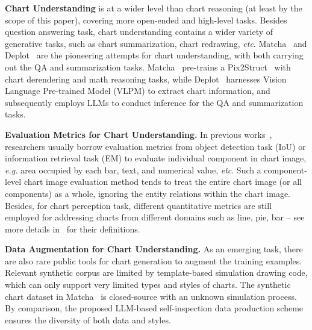 \documentclass{article} \usepackage{iclr2024_conference,times}
\begin{document}
\textbf{Chart Understanding} is at a wider level than chart reasoning (at least by the scope of this paper), covering more open-ended and high-level tasks. Besides question answering task, chart understanding contains a wider variety of generative tasks, such as chart summarization, chart redrawing, \textit{etc}. Matcha~\citep{Liu2022MatChaEV} and Deplot~\citep{Liu2022DePlotOV} are the pioneering attempts for chart understanding, with both carrying out the QA and summarization tasks. Matcha~\citep{Liu2022MatChaEV} pre-trains a Pix2Struct~\citep{Lee2022Pix2StructSP} with chart derendering and math reasoning tasks, while Deplot~\citep{Liu2022DePlotOV} harnesses Vision Language Pre-trained Model (VLPM) to extract chart information, and subsequently employs LLMs to conduct inference for the QA and summarization tasks.



\textbf{Evaluation Metrics for Chart Understanding.} In previous works~\citep{Savva2011ReVisionAC,Rane2021ChartReaderAP,Liu2019DataEF,Choi2019VisualizingFT}, researchers usually borrow evaluation metrics from object detection task (IoU) or information retrieval task (EM) to evaluate individual component in chart image, \textit{e.g.} area occupied by each bar, text, and numerical value, \textit{etc}. Such a component-level chart image evaluation method tends to treat the entire chart image (or all components) as a whole, ignoring the entity relations within the chart image.
Besides, for chart perception task, different quantitative metrics are still employed for addressing charts from different domains such as line, pie, bar -- see more details in~\citep{Luo2021ChartOCRDE} for their definitions. 

\textbf{Data Augmentation for Chart Understanding.} 
As an emerging task, there are also rare public tools for chart generation to augment the training examples. Relevant synthetic corpus \citep{Kahou2017FigureQAAA,Methani2019PlotQARO} are limited by template-based simulation drawing code, which can only support very limited types and styles of charts. The synthetic chart dataset in Matcha~\citep{Liu2022MatChaEV} is closed-source with an unknown simulation process. By comparison, the proposed LLM-based self-inspection data production scheme ensures the diversity of both data and styles.
\end{document}
